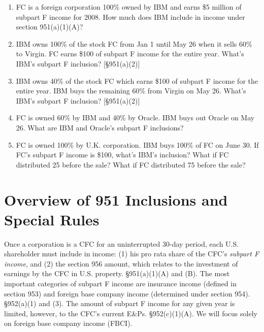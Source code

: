 \begin{select}
\begin{enumerate}
	\item FC is a foreign corporation 100\% owned by IBM and earns \$5 million of subpart F income for 2008.  How much does IBM include in income under section 951(a)(1)(A)?
	\item   IBM owns 100\% of the stock FC from Jan 1 until May 26 when it sells 60\% to Virgin.  FC earns \$100 of subpart F income for the entire year.  What's IBM's subpart F inclusion? [\S 951(a)(2)]
	\item IBM owns 40\% of the stock FC which earns \$100 of subpart F income for the entire year.  IBM buys the remaining 60\% from Virgin on May 26.  What's IBM's subpart F inclusion? [\S 951(a)(2)]  
	\item FC is owned 60\% by IBM and 40\% by Oracle.  IBM buys out Oracle on May 26.  What are IBM and Oracle's subpart F inclusions?  
	\item 	FC is owned 100\% by U.K. corporation.  IBM buys 100\% of FC on June 30.  If FC's subpart F income is \$100, what's IBM's inclusion?  What if FC distributed 25 before the sale?  What if FC distributed 75 before the sale?
	
	\end{enumerate}
		
	\end{select}
		
	\section{Overview of 951 Inclusions and Special Rules}
		
Once a corporation is a CFC for an uninterrupted 30-day period, each U.S. shareholder must include in income: (1) his pro rata share of the CFC's \emph{subpart F income}, and (2) the section 956 amount, which relates to the investment of earnings by the CFC in U.S. property.  \S951(a)(1)(A) and (B).  The most important categories of subpart F income are insurance income (defined in section 953) and foreign base company income (determined under section 954).  \S 952(a)(1) and (3).  The amount of subpart F income for any given year is limited, however, to the CFC's current E\&Ps.  \S952(c)(1)(A).  We will focus solely on foreign base company income (FBCI).
		

